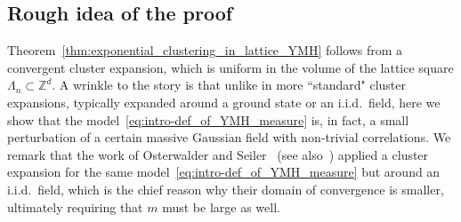 \documentclass[11pt]{article}
\theoremstyle{definition}
\theoremstyle{remark}
\numberwithin{theorem}{section}
\def\La{{\Lambda}}
\newcommand{\bZ}{\mathbb Z}
\begin{document}
    
 
    
    \subsection{Rough idea of the proof}
    \label{subsection:idea_of_the_proof}

    Theorem~\ref{thm:exponential_clustering_in_lattice_YMH} follows from a convergent cluster expansion, which is uniform in the volume of the lattice square $\La_n \subset \bZ^d$. A wrinkle to the story is that unlike in more ``standard" cluster expansions, typically expanded around a ground state or an i.i.d.\ field, here we show that the model~\eqref{eq:intro-def_of_YMH_measure} is, in fact, a small perturbation of a certain massive Gaussian field with non-trivial correlations. We remark that the work of Osterwalder and Seiler~\cite{Osterwalder-Seiler} (see also~\cite[Appendix]{Fradkin-Shenker}) applied a cluster expansion for the same model~\eqref{eq:intro-def_of_YMH_measure} but around an i.i.d.\ field, which is the chief reason why their domain of convergence is smaller, ultimately requiring that $m$ must  be large as well. 
    
\end{document}
